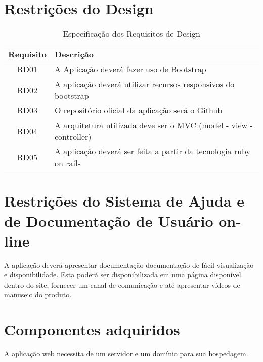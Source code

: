 \begin{apendicesenv}
{\large {\section { Restrições do Design \\ } } }

\begin{table}[H]
                \centering
                \caption{Especificação dos Requisitos de Design}
                \begin{tabular}{c|p{10cm}}
                    \hline
                    \textbf{Requisito} & \textbf{Descrição}\\
                    \hline
                    RD01 & A Aplicação deverá fazer uso de Bootstrap\\
                    \hline
                    RD02 & A aplicação deverá utilizar recursos responsivos do bootstrap\\
                    \hline
                    RD03 & O repositório oficial da aplicação será o Github\\
                    \hline
                    RD04 & A arquitetura utilizada deve ser o MVC (model - view - controller)\\
                    \hline
                    RD05 &  A aplicação deverá ser feita a  partir da tecnologia ruby on rails\\
                    \hline
                \end{tabular}
            \end{table}

{\large {\section { Restrições do Sistema de Ajuda e de Documentação de Usuário on-line \\ } } }

A aplicação deverá apresentar documentação documentação de fácil visualização e disponibilidade. Esta poderá ser disponibilizada em uma página disponível dentro do site, fornecer um canal de comunicação e  até apresentar vídeos de manuseio do produto.\\

{\large {\section { Componentes adquiridos \\ } } }

A aplicação web necessita de um servidor e um domínio para sua hospedagem.\\


\end{apendicesenv}

